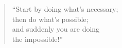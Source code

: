 

\begin{quote}
	``Start by doing what's necessary;\\
	then do what's possible;\\
	and suddenly you are doing\\
	the impossible!''
\end{quote}